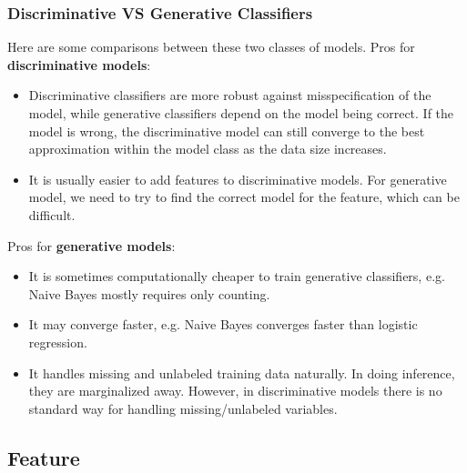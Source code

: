 \documentclass{article}
\begin{document}
   \subsubsection{Discriminative VS Generative Classifiers}
   Here are some comparisons between these two classes of models. Pros for \textbf{discriminative models}:
   \begin{itemize}
   \item Discriminative classifiers are more robust against misspecification of the model, while generative classifiers depend on the model being correct. If the model is wrong, the discriminative model can still converge to the best approximation within the model class as the data size increases.
   \item It is usually easier to add features to discriminative models. For generative model, we need to try to find the correct model for the feature, which can be difficult.
   \end{itemize}
   Pros for \textbf{generative models}:
   \begin{itemize}
   \item It is sometimes computationally cheaper to train generative classifiers, e.g. Naive Bayes mostly requires only counting.
   \item It may converge faster, e.g. Naive Bayes converges faster than logistic regression.
   \item It handles missing and unlabeled training data naturally. In doing inference, they are marginalized away. However, in discriminative models there is no standard way for handling missing/unlabeled variables.
   \end{itemize}
   
   \subsection{Feature}
\end{document}
